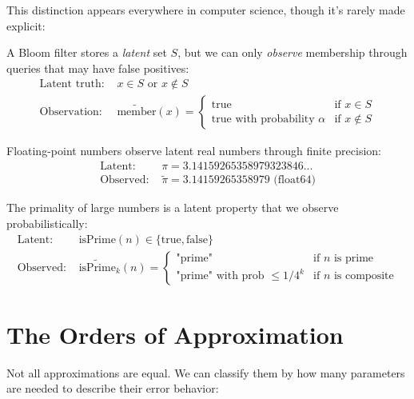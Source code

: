 This distinction appears everywhere in computer science, though it's rarely made explicit:

\begin{example}
A Bloom filter stores a \textit{latent} set $S$, but we can only \textit{observe} membership through queries that may have false positives:
\begin{align}
\text{Latent truth: } & x \in S \text{ or } x \notin S \\
\text{Observation: } & \tilde{\text{member}}(x) = \begin{cases}
\text{true} & \text{if } x \in S \\
\text{true with probability } \alpha & \text{if } x \notin S
\end{cases}
\end{align}
\end{example}

\begin{example}
Floating-point numbers observe latent real numbers through finite precision:
\begin{align}
\text{Latent: } & \pi = 3.14159265358979323846... \\
\text{Observed: } & \tilde{\pi} = 3.14159265358979 \text{ (float64)}
\end{align}
\end{example}

\begin{example}
The primality of large numbers is a latent property that we observe probabilistically:
\begin{align}
\text{Latent: } & \text{isPrime}(n) \in \{\text{true}, \text{false}\} \\
\text{Observed: } & \tilde{\text{isPrime}}_k(n) = \begin{cases}
\text{"prime"} & \text{if } n \text{ is prime} \\
\text{"prime"} \text{ with prob } \leq 1/4^k & \text{if } n \text{ is composite}
\end{cases}
\end{align}
\end{example}

\section{The Orders of Approximation}

Not all approximations are equal. We can classify them by how many parameters are needed to describe their error behavior:

